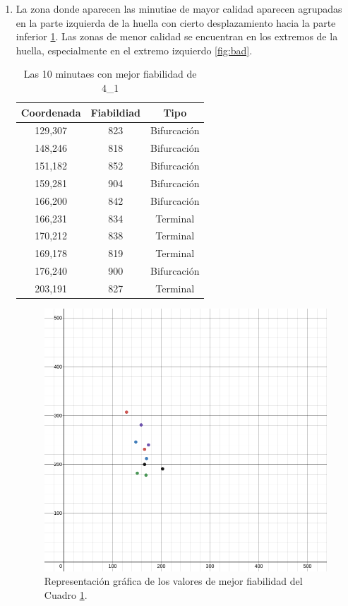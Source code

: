 \documentclass[10pt,a4paper]{article}
\begin{document}
\begin{enumerate}[label=\textbf{\alph*)}]
\item La zona donde aparecen las minutiae de mayor calidad aparecen agrupadas en la parte izquierda de la huella con cierto desplazamiento hacia la parte inferior \ref{fig:good}. Las zonas de menor calidad se encuentran en los extremos de la huella, especialmente en el extremo izquierdo \ref{fig:bad}.

\begin{table}[h!]
\centering
\begin{tabular}{|c|c|c|}
\hline
 \textbf{Coordenada} & \textbf{Fiabildiad} & \textbf{Tipo}\\ \hline
 129,307 & 823 & Bifurcación\\ \hline
 148,246 & 818 & Bifurcación\\ \hline
 151,182 & 852 & Bifurcación\\ \hline
 159,281 & 904 & Bifurcación\\ \hline
 166,200 & 842 & Bifurcación\\ \hline
 166,231 & 834 & Terminal\\ \hline
 170,212 & 838 & Terminal\\ \hline
 169,178 & 819 & Terminal\\ \hline
 176,240 & 900 & Bifurcación\\ \hline
 203,191 & 827 & Terminal\\ \hline
\end{tabular}
  \caption{Las 10 minutaes con mejor fiabilidad de 4\_1}
  \label{tabla:good}
\end{table}

\pagebreak

\begin{figure}[h!]
\centering
  \includegraphics[width=.4\linewidth]{good.png}
  \caption{Representación gráfica de los valores de mejor fiabilidad del Cuadro \ref{tabla:good}.}
  \label{fig:good}
\end{figure}


\end{enumerate}
\end{document}
